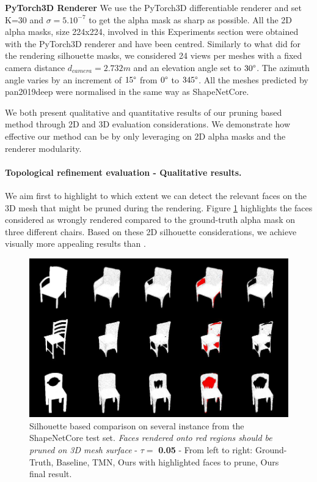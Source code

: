 \noindent\textbf{PyTorch3D Renderer} We use the PyTorch3D \citep{nie2020total3dunderstanding} differentiable renderer and set K=30 and $\sigma=5.10^{-7}$ to get the alpha mask as sharp as possible. All the 2D alpha masks, size 224x224, involved in this Experiments section were obtained with the PyTorch3D renderer and have been centred. Similarly to what \citep{choy20163d,liu2019soft,yan2016perspective} did for the rendering silhouette masks, we considered 24 views per meshes with a fixed camera distance $d_{camera}=2.732m$ and an elevation angle set to $30\degree$. The azimuth angle varies by an increment of $15\degree$ from $0\degree$ to $345\degree$. All the meshes predicted by pan2019deep \citep{pan2019deep} were normalised in the same way as ShapeNetCore\citep{chang2015shapenet}. 

We both present qualitative and quantitative results of our pruning based method through 2D and 3D evaluation considerations. We demonstrate how effective our method can be by only leveraging on 2D alpha masks and the renderer modularity. 

\paragraph{Topological refinement evaluation - Qualitative results.} We aim first to highlight to which extent we can detect the relevant faces on the 3D mesh that might be pruned during the rendering. Figure \ref{fig:face2prune} highlights the faces considered as wrongly rendered compared to the ground-truth alpha mask on three different chairs. Based on these 2D silhouette considerations, we achieve visually more appealing results than \citep{pan2019deep}. 

\begin{figure}[htp!]%
\begin{center}
\includegraphics[width=\linewidth]{images/adaptativesr/highlight_faces.png}
\end{center}
    \caption{Silhouette based comparison on several instance from the ShapeNetCore test set. \textit{Faces rendered onto red regions should be pruned on 3D mesh surface} - $\tau = $ \textbf{0.05} - From left to right: Ground-Truth, Baseline, TMN\citep{pan2019deep}, Ours with highlighted faces to prune, Ours final result.}
\label{fig:face2prune}
\end{figure}

